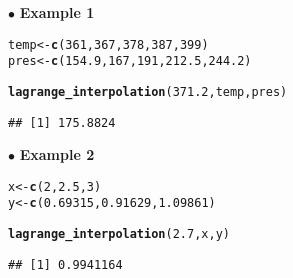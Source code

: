 \documentclass[11pt, a4paper]{article}\usepackage[]{graphicx}\usepackage[]{xcolor}
\makeatletter
\newcommand{\hlnum}[1]{\textcolor[rgb]{0.686,0.059,0.569}{#1}}%
\newcommand{\hldef}[1]{\textcolor[rgb]{0.345,0.345,0.345}{#1}}%
\newcommand{\hlkwb}[1]{\textcolor[rgb]{0.69,0.353,0.396}{#1}}%
\newcommand{\hlkwd}[1]{\textcolor[rgb]{0.737,0.353,0.396}{\textbf{#1}}}%
\newenvironment{kframe}{%
 \def\at@end@of@kframe{}%
 \ifinner\ifhmode%
  \def\at@end@of@kframe{\end{minipage}}%
  \begin{minipage}{\columnwidth}%
 \fi\fi%
 \def\FrameCommand##1{\hskip\@totalleftmargin \hskip-\fboxsep
 \colorbox{shadecolor}{##1}\hskip-\fboxsep
     \hskip-\linewidth \hskip-\@totalleftmargin \hskip\columnwidth}%
 \MakeFramed {\advance\hsize-\width
   \@totalleftmargin\z@ \linewidth\hsize
   \@setminipage}}%
 {\par\unskip\endMakeFramed%
 \at@end@of@kframe}
\newenvironment{knitrout}{}{} %
\makeatother
\begin{document}
\newpage

$\bullet$ \textbf{Example 1}

\begin{knitrout}
\color{fgcolor}\begin{kframe}
\begin{alltt}
\hldef{temp} \hlkwb{<-} \hlkwd{c}\hldef{(}\hlnum{361}\hldef{,} \hlnum{367}\hldef{,} \hlnum{378}\hldef{,} \hlnum{387}\hldef{,} \hlnum{399}\hldef{)}
\hldef{pres} \hlkwb{<-} \hlkwd{c}\hldef{(}\hlnum{154.9}\hldef{,} \hlnum{167}\hldef{,} \hlnum{191}\hldef{,} \hlnum{212.5}\hldef{,} \hlnum{244.2}\hldef{)}
\end{alltt}
\end{kframe}
\end{knitrout}

\begin{knitrout}
\color{fgcolor}\begin{kframe}
\begin{alltt}
\hlkwd{lagrange_interpolation}\hldef{(}\hlnum{371.2}\hldef{, temp, pres)}
\end{alltt}
\begin{verbatim}
## [1] 175.8824
\end{verbatim}
\end{kframe}
\end{knitrout}

$\bullet$ \textbf{Example 2}

\begin{knitrout}
\color{fgcolor}\begin{kframe}
\begin{alltt}
\hldef{x} \hlkwb{<-} \hlkwd{c}\hldef{(}\hlnum{2}\hldef{,} \hlnum{2.5}\hldef{,} \hlnum{3}\hldef{)}
\hldef{y} \hlkwb{<-} \hlkwd{c}\hldef{(}\hlnum{0.69315}\hldef{,} \hlnum{0.91629}\hldef{,} \hlnum{1.09861}\hldef{)}
\end{alltt}
\end{kframe}
\end{knitrout}

\begin{knitrout}
\color{fgcolor}\begin{kframe}
\begin{alltt}
\hlkwd{lagrange_interpolation}\hldef{(}\hlnum{2.7}\hldef{, x, y)}
\end{alltt}
\begin{verbatim}
## [1] 0.9941164
\end{verbatim}
\end{kframe}
\end{knitrout}
\end{document}
